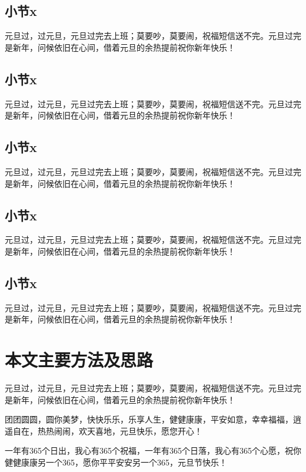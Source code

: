 \subsection{小节x}

元旦过，过元旦，元旦过完去上班；莫要吵，莫要闹，祝福短信送不完。元旦过完是新年，问候依旧在心间，借着元旦的余热提前祝你新年快乐！

\subsection{小节x}

元旦过，过元旦，元旦过完去上班；莫要吵，莫要闹，祝福短信送不完。元旦过完是新年，问候依旧在心间，借着元旦的余热提前祝你新年快乐！

\subsection{小节x}

元旦过，过元旦，元旦过完去上班；莫要吵，莫要闹，祝福短信送不完。元旦过完是新年，问候依旧在心间，借着元旦的余热提前祝你新年快乐！

\subsection{小节x}

元旦过，过元旦，元旦过完去上班；莫要吵，莫要闹，祝福短信送不完。元旦过完是新年，问候依旧在心间，借着元旦的余热提前祝你新年快乐！

\subsection{小节x}

元旦过，过元旦，元旦过完去上班；莫要吵，莫要闹，祝福短信送不完。元旦过完是新年，问候依旧在心间，借着元旦的余热提前祝你新年快乐！


\section{本文主要方法及思路}

元旦过，过元旦，元旦过完去上班；莫要吵，莫要闹，祝福短信送不完。元旦过完是新年，问候依旧在心间，借着元旦的余热提前祝你新年快乐！

团团圆圆，圆你美梦，快快乐乐，乐享人生，健健康康，平安如意，幸幸福福，逍遥自在，热热闹闹，欢天喜地，元旦快乐，愿您开心！

一年有365个日出，我心有365个祝福，一年有365个日落，我心有365个心愿，祝你健健康康另一个365，愿你平平安安另一个365，元旦节快乐！

